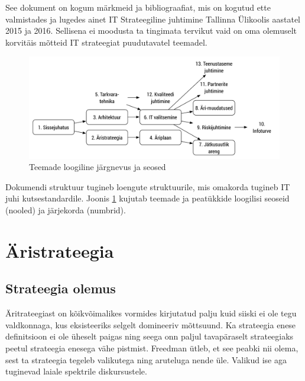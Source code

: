 \documentclass{tufte-book}
\begin{document}
See dokument on kogum märkmeid ja bibliograafiat, mis on kogutud ette valmistades ja lugedes ainet IT Strateegiline juhtimine Tallinna Ülikoolis aastatel 2015 ja 2016. Sellisena ei moodusta ta tingimata tervikut vaid on oma olemuselt korvitäis mõtteid IT strateegiat puudutavatel teemadel.


\begin{figure}[h]
	\begin{center}
		\includegraphics[width=\linewidth]{aine_struktuur.pdf}
		\caption{Teemade loogiline järgnevus ja seosed}
		\label{fig:intro:structure}
	\end{center}
\end{figure}

Dokumendi struktuur tugineb loengute struktuurile, mis omakorda tugineb IT juhi kutsestandardile. Joonis \ref{fig:intro:structure} kujutab teemade ja peatükkide loogilisi seoseid (nooled) ja järjekorda (numbrid).

\mainmatter

\chapter{Äristrateegia}
\section{Strateegia olemus}
Äritrateegiast on kõikvõimalikes vormides kirjutatud palju kuid siiski ei ole tegu valdkonnaga, kus eksisteeriks selgelt domineeriv mõttsuund. Ka strateegia enese definitsioon ei ole üheselt paigas ning seega onn paljul tavapäraselt strateegiaks peetul strateegia enesega vähe pistmist\cite{de2006strategy}. Freedman ütleb, et see peabki nii olema, sest ta strateegia tegeleb valikutega ning aruteluga nende üle. Valikud ise aga tuginevad laiale spektrile diskursustele.\cite{freedman2013strategy} 
\end{document}
